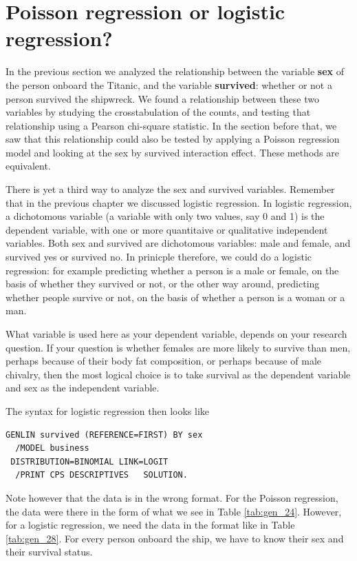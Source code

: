\documentclass[]{book}\usepackage[]{graphicx}\usepackage[]{color}
\begin{document}
\section{Poisson regression or logistic regression?}


In the previous section we analyzed the relationship between the variable \textbf{sex} of the person onboard the Titanic, and the variable \textbf{survived}: whether or not a person survived the shipwreck. We found a relationship between these two variables by studying the crosstabulation of the counts, and testing that relationship using a Pearson chi-square statistic. In the section before that, we saw that this relationship could also be tested by applying a Poisson regression model and looking at the sex by survived interaction effect. These methods are equivalent.

There is yet a third way to analyze the sex and survived variables. Remember that in the previous chapter we discussed logistic regression. In logistic regression, a dichotomous variable (a variable with only two values, say 0 and 1) is the dependent variable, with one or more quantitaive or qualitative independent variables. Both sex and survived are dichotomous variables: male and female, and survived yes or survived no. In prinicple therefore, we could do a logistic regression: for example predicting whether a person is a male or female, on the basis of whether they survived or not, or the other way around, predicting whether people survive or not, on the basis of whether a person is a woman or a man.


What variable is used here as your dependent variable, depends on your research question. If your question is whether females are more likely to survive than men, perhaps because of their body fat composition, or perhaps because of male chivalry, then the most logical choice is to take survival as the dependent variable and sex as the independent variable.

The syntax for logistic regression then looks like

\begin{verbatim}
GENLIN survived (REFERENCE=FIRST) BY sex
  /MODEL business
 DISTRIBUTION=BINOMIAL LINK=LOGIT
  /PRINT CPS DESCRIPTIVES   SOLUTION.
\end{verbatim}


Note however that the data is in the wrong format. For the Poisson regression, the data were there in the form of what we see in Table \ref{tab:gen_24}. However, for a logistic regression, we need the data in the format like in Table \ref{tab:gen_28}. For every person onboard the ship, we have to know their sex and their survival status.
\end{document}
